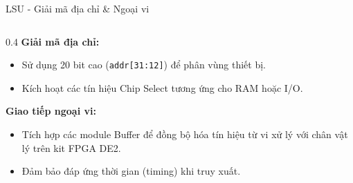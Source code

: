 \begin{frame}{LSU - Giải mã địa chỉ \& Ngoại vi}
	\begin{columns}[T]
		\begin{column}{0.4\textwidth}
			\footnotesize
			\textbf{Giải mã địa chỉ:}
			\begin{itemize}
				\item Sử dụng 20 bit cao (\texttt{addr[31:12]}) để phân vùng thiết bị.
				\item Kích hoạt các tín hiệu Chip Select tương ứng cho RAM hoặc I/O.
			\end{itemize}
			
			\vspace{0.2cm}
			\textbf{Giao tiếp ngoại vi:}
			\begin{itemize}
				\item Tích hợp các module Buffer để đồng bộ hóa tín hiệu từ vi xử lý với chân vật lý trên kit FPGA DE2.
				\item Đảm bảo đáp ứng thời gian (timing) khi truy xuất.
			\end{itemize}
		\end{column}
		

\end{columns}
\end{frame}
